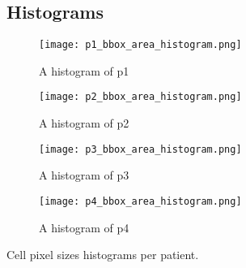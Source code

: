\documentclass[runningheads]{llncs}
\begin{document}
\FloatBarrier
\subsection{Histograms}\label{appendixhist}{
	        
	\begin{figure}
		\centering
		\texttt{[image: p1\_bbox\_area\_histogram.png]}
		\caption{A histogram of p1 } \label{p1}
	\end{figure}
	        
	\begin{figure}
		\centering
		\texttt{[image: p2\_bbox\_area\_histogram.png]}
		\caption{A histogram of p2 } \label{p2}
	\end{figure}
	        
	        
	\begin{figure}
		\centering
		\texttt{[image: p3\_bbox\_area\_histogram.png]}
		\caption{A histogram of p3 } \label{p3}
	\end{figure}
	        
	        
	\begin{figure}
		\centering
		\texttt{[image: p4\_bbox\_area\_histogram.png]}
		\caption{A histogram of p4 } \label{p4}
	\end{figure}
	Cell pixel sizes histograms per patient. 
}
\end{document}
